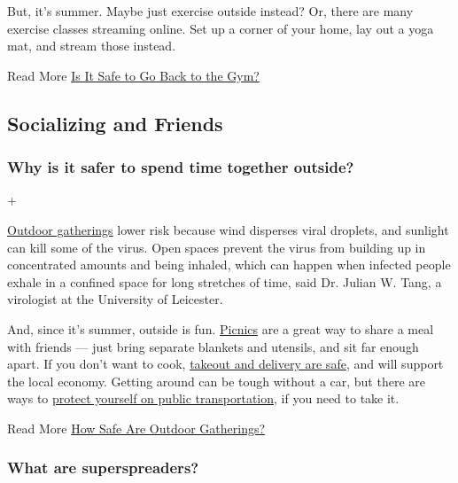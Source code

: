 But, it's summer. Maybe just exercise outside instead? Or, there are
many exercise classes streaming online. Set up a corner of your home,
lay out a yoga mat, and stream those instead.

 Read More
\href{https://www.nytimes3xbfgragh.onion/2020/05/13/well/move/coronavirus-gym-safety.html}{Is
It Safe to Go Back to the Gym?}

\hypertarget{socializing-and-friends}{%
\subsection{Socializing and Friends}\label{socializing-and-friends}}

\hypertarget{why-is-it-safer-to-spend-time-together-outside}{%
\subsubsection{Why is it safer to spend time together
outside?}\label{why-is-it-safer-to-spend-time-together-outside}}

+

\href{https://www.nytimes3xbfgragh.onion/2020/05/15/us/coronavirus-what-to-do-outside.html}{Outdoor
gatherings} lower risk because wind disperses viral droplets, and
sunlight can kill some of the virus. Open spaces prevent the virus from
building up in concentrated amounts and being inhaled, which can happen
when infected people exhale in a confined space for long stretches of
time, said Dr. Julian W. Tang, a virologist at the University of
Leicester.

And, since it's summer, outside is fun.
\href{https://www.nytimes3xbfgragh.onion/2020/05/09/dining/coronavirus-how-to-have-a-picnic-safely.html}{Picnics}
are a great way to share a meal with friends --- just bring separate
blankets and utensils, and sit far enough apart. If you don't want to
cook,
\href{https://www.nytimes3xbfgragh.onion/2020/05/27/dining/takeout-delivery-safety-coronavirus.html}{takeout
and delivery are safe}, and will support the local economy. Getting
around can be tough without a car, but there are ways to
\href{https://www.nytimes3xbfgragh.onion/2020/06/08/nyregion/mta-subway-riding-health-coronavirus.html}{protect
yourself on public transportation}, if you need to take it.

 Read More
\href{https://www.nytimes3xbfgragh.onion/2020/07/03/well/live/coronavirus-spread-outdoors-party.html}{How
Safe Are Outdoor Gatherings?}

\hypertarget{what-are-superspreaders}{%
\subsubsection{What are superspreaders?}\label{what-are-superspreaders}}

